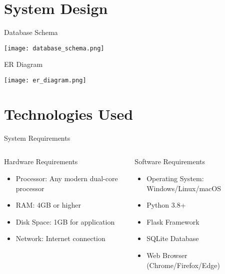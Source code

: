 \documentclass{beamer}
\begin{document}
\section{System Design}

\begin{frame}{Database Schema}
  \begin{center}
    \texttt{[image: database\_schema.png]}
  \end{center}
\end{frame}

\begin{frame}{ER Diagram}
  \begin{center}
    \texttt{[image: er\_diagram.png]}
  \end{center}
\end{frame}

\section{Technologies Used}

\begin{frame}{System Requirements}
  \begin{columns}[T]
    \begin{column}{0.47\textwidth}
      \begin{block}{Hardware Requirements}
        \begin{itemize}
          \item Processor: Any modern dual-core processor
          \item RAM: 4GB or higher
          \item Disk Space: 1GB for application
          \item Network: Internet connection
        \end{itemize}
      \end{block}
    \end{column}
    \hspace{0.06\textwidth} %
    \begin{column}{0.47\textwidth}
      \begin{block}{Software Requirements}
        \begin{itemize}
          \item Operating System: Windows/Linux/macOS
          \item Python 3.8+
          \item Flask Framework
          \item SQLite Database
          \item Web Browser (Chrome/Firefox/Edge)
        \end{itemize}
      \end{block}
    \end{column}
    \hspace{-0.1em}
  \end{columns}
\end{frame}
\end{document}
